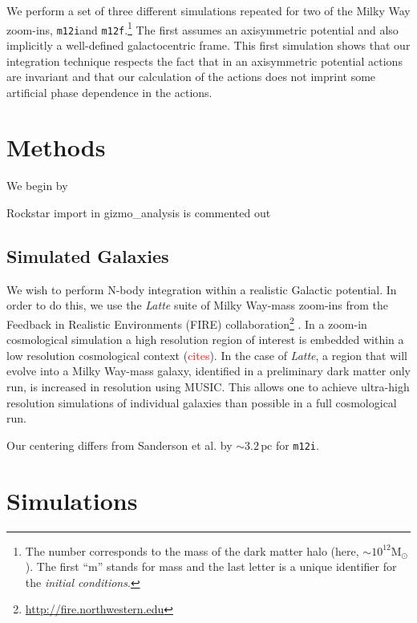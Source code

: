 \documentclass[twocolumn]{aastex62}
\newcommand{\Gus}[1]{\textcolor{red}{#1}}
\newcommand{\Msun}{\text{M}_\odot}
\newcommand{\pc}{\text{pc}}
\newcommand{\mi}{\texttt{m12i}}
\newcommand{\mf}{\texttt{m12f}}
\begin{document}
We perform a set of three different simulations repeated for two of the Milky Way zoom-ins, \mi and \mf.\footnote{The number corresponds to the mass of the dark matter halo (here, $\sim 10^{12} \Msun$). The first ``m'' stands for mass and the last letter is a unique identifier for the {\em initial conditions}.} The first assumes an axisymmetric potential and also implicitly a well-defined galactocentric frame. This first simulation shows that our integration technique respects the fact that in an axisymmetric potential actions are invariant and that our calculation of the actions does not imprint some artificial phase dependence in the actions.


\section{Methods} \label{sec:methods}
We begin by 

Rockstar import in gizmo_analysis is commented out

\subsection{Simulated Galaxies} \label{ssec:fire}
We wish to perform N-body integration within a realistic Galactic potential. In order to do this, we use the {\em Latte} suite of Milky Way-mass zoom-ins from the Feedback in Realistic Environments (FIRE) collaboration\footnote{\url{http://fire.northwestern.edu}} \citep{2016ApJ...827L..23W,2018MNRAS.480..800H}. In a zoom-in cosmological simulation a high resolution region of interest is embedded within a low resolution cosmological context (\Gus{cites}). In the case of {\em Latte}, a region that will evolve into a Milky Way-mass galaxy, identified in a preliminary dark matter only run, is increased in resolution using MUSIC. This allows one to achieve ultra-high resolution simulations of individual galaxies than possible in a full cosmological run.

Our centering differs from Sanderson et al. by $\sim3.2\,\pc$ for \mi.


\section{Simulations}


\end{document}
